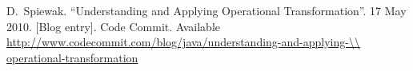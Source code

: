 \documentclass[letterpaper,11pt,twocolumn]{article}
\begin{document}
\begin{thebibliography}{S} %

  D.\ Spiewak. ``Understanding and Applying Operational Transformation''. 17 May 2010. [Blog entry]. Code Commit. Available \url{http://www.codecommit.com/blog/java/understanding-and-applying-\\ operational-transformation}



\end{thebibliography}
\end{document}
